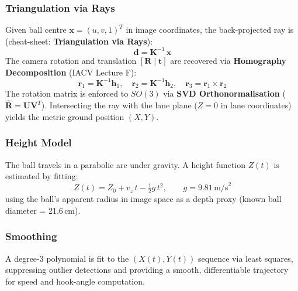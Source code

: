 \documentclass[11pt,twoside]{article}
\begin{document}
{}

\subsubsection*{Triangulation via Rays}
Given ball centre $\mathbf{x} = (u, v, 1)^T$ in image coordinates, the back-projected ray is (cheat-sheet: \textbf{Triangulation via Rays}):
\begin{equation}
    \mathbf{d} = \mathbf{K}^{-1}\,\mathbf{x}
\end{equation}
The camera rotation and translation $[\mathbf{R} \mid \mathbf{t}]$ are recovered via \textbf{Homography Decomposition} (IACV Lecture F):
\begin{equation}
    \mathbf{r}_1 = \mathbf{K}^{-1}\mathbf{h}_1, \quad
    \mathbf{r}_2 = \mathbf{K}^{-1}\mathbf{h}_2, \quad
    \mathbf{r}_3 = \mathbf{r}_1 \times \mathbf{r}_2
\end{equation}
The rotation matrix is enforced to $SO(3)$ via \textbf{SVD Orthonormalisation} ($\hat{\mathbf{R}} = \mathbf{U}\mathbf{V}^T$).
Intersecting the ray with the lane plane ($Z = 0$ in lane coordinates) yields the metric ground position $(X, Y)$.

\subsubsection*{Height Model}
The ball travels in a parabolic arc under gravity.
A height function $Z(t)$ is estimated by fitting:
\begin{equation}
    Z(t) = Z_0 + v_z\,t - \tfrac{1}{2}g\,t^2, \qquad g = 9.81\,\text{m/s}^2
\end{equation}
using the ball's apparent radius in image space as a depth proxy (known ball diameter = 21.6\,cm).

\subsubsection*{Smoothing}
A degree-3 polynomial is fit to the $(X(t), Y(t))$ sequence via least squares, suppressing outlier detections and providing a smooth, differentiable trajectory for speed and hook-angle computation.

{}
\end{document}

